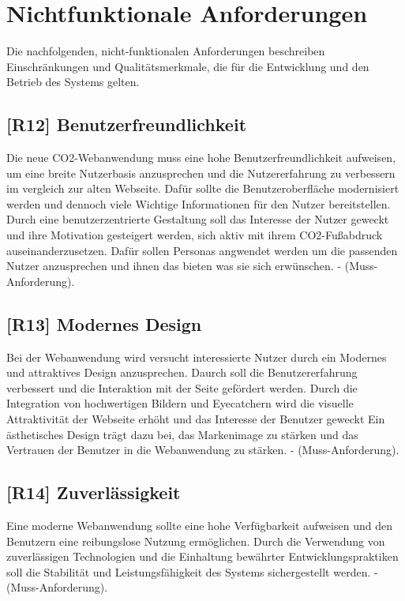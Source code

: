\section{Nichtfunktionale Anforderungen}
\label{chapter:3-section:nichtfunktionale-anforderungen}

Die nachfolgenden, nicht-funktionalen Anforderungen beschreiben Einschränkungen und Qualitätsmerkmale, die für die Entwicklung und den Betrieb des Systems gelten.

\subsection{[R12] Benutzerfreundlichkeit}

Die neue CO2-Webanwendung muss eine hohe Benutzerfreundlichkeit aufweisen, um eine breite Nutzerbasis anzusprechen und die Nutzererfahrung zu verbessern im vergleich zur alten Webseite. Dafür sollte die Benutzeroberfläche modernisiert werden und dennoch viele Wichtige Informationen für den Nutzer bereitstellen. Durch eine benutzerzentrierte Gestaltung soll das Interesse der Nutzer geweckt und ihre Motivation gesteigert werden, sich aktiv mit ihrem CO2-Fußabdruck auseinanderzusetzen. Dafür sollen Personas angwendet werden um die passenden Nutzer anzusprechen und ihnen das bieten was sie sich erwünschen. - (Muss-Anforderung).

\subsection{[R13] Modernes Design}

Bei der Webanwendung wird versucht interessierte Nutzer durch ein Modernes und attraktives Design anzusprechen. Daurch soll die Benutzererfahrung verbessert und die Interaktion mit der Seite gefördert werden. Durch die Integration von hochwertigen Bildern und Eyecatchern wird die visuelle Attraktivität der Webseite erhöht und das Interesse der Benutzer geweckt Ein ästhetisches Design trägt dazu bei, das Markenimage zu stärken und das Vertrauen der Benutzer in die Webanwendung zu stärken. - (Muss-Anforderung).

\subsection{[R14] Zuverlässigkeit}

Eine moderne Webanwendung sollte eine hohe Verfügbarkeit aufweisen und den Benutzern eine reibungslose Nutzung ermöglichen. Durch die Verwendung von zuverlässigen Technologien und die Einhaltung bewährter Entwicklungspraktiken soll die Stabilität und Leistungsfähigkeit des Systems sichergestellt werden. - (Muss-Anforderung).

